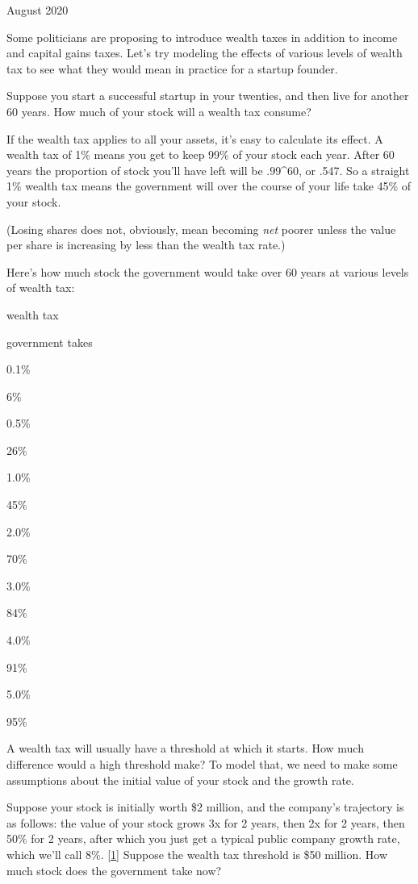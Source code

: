 August 2020

Some politicians are proposing to introduce wealth taxes in addition to
income and capital gains taxes. Let's try modeling the effects of
various levels of wealth tax to see what they would mean in practice for
a startup founder.

Suppose you start a successful startup in your twenties, and then live
for another 60 years. How much of your stock will a wealth tax consume?

If the wealth tax applies to all your assets, it's easy to calculate its
effect. A wealth tax of 1\% means you get to keep 99\% of your stock
each year. After 60 years the proportion of stock you'll have left will
be .99\^{}60, or .547. So a straight 1\% wealth tax means the government
will over the course of your life take 45\% of your stock.

(Losing shares does not, obviously, mean becoming \emph{net} poorer
unless the value per share is increasing by less than the wealth tax
rate.)

Here's how much stock the government would take over 60 years at various
levels of wealth tax:

wealth tax

government takes

0.1\%

6\%

0.5\%

26\%

1.0\%

45\%

2.0\%

70\%

3.0\%

84\%

4.0\%

91\%

5.0\%

95\%

A wealth tax will usually have a threshold at which it starts. How much
difference would a high threshold make? To model that, we need to make
some assumptions about the initial value of your stock and the growth
rate.

Suppose your stock is initially worth \$2 million, and the company's
trajectory is as follows: the value of your stock grows 3x for 2 years,
then 2x for 2 years, then 50\% for 2 years, after which you just get a
typical public company growth rate, which we'll call 8\%.
{[}\hyperref[f1n]{1}{]} Suppose the wealth tax threshold is \$50
million. How much stock does the government take now?

